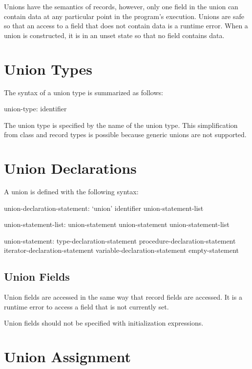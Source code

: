 \label{Unions}

Unions have the semantics of records, however, only one field in the
union can contain data at any particular point in the program's
execution.  Unions are safe so that an access to a field that does not
contain data is a runtime error.  When a union is constructed, it is
in an unset state so that no field contains data.

\section{Union Types}
\label{Union_Types}

The syntax of a union type is summarized as follows:
\begin{syntax}
union-type:
  identifier
\end{syntax}
The union type is specified by the name of the union type.  This
simplification from class and record types is possible because generic
unions are not supported.

\section{Union Declarations}
\label{Union_Declarations}

A union is defined with the following syntax:
\begin{syntax}
union-declaration-statement:
  `union' identifier { union-statement-list }

union-statement-list:
  union-statement
  union-statement union-statement-list

union-statement:
  type-declaration-statement
  procedure-declaration-statement
  iterator-declaration-statement
  variable-declaration-statement
  empty-statement
\end{syntax}

\subsection{Union Fields}
\label{Union_Fields}

Union fields are accessed in the same way that record fields are
accessed.  It is a runtime error to access a field that is not
currently set.

Union fields should not be specified with initialization expressions.

\section{Union Assignment}
\label{Union_Assignment}


